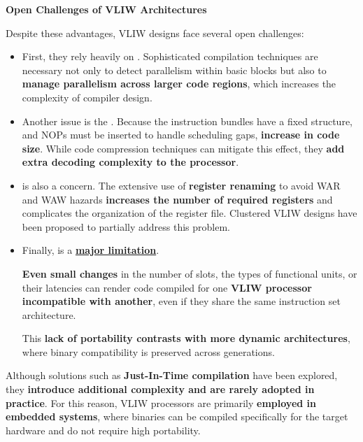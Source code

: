 \highspace
\begin{flushleft}
    \textcolor{Red2}{ \textbf{Open Challenges of VLIW Architectures}}
\end{flushleft}
Despite these advantages, VLIW designs face several open challenges:
\begin{itemize}
    \item First, they rely heavily on . Sophisticated compilation techniques are necessary not only to detect parallelism within basic blocks but also to \textbf{manage parallelism across larger code regions}, which increases the complexity of compiler design.

    \item Another issue is the . Because the instruction bundles have a fixed structure, and NOPs must be inserted to handle scheduling gaps, \textbf{increase in code size}. While code compression techniques can mitigate this effect, they \textbf{add extra decoding complexity to the processor}.

    \item {} is also a concern. The extensive use of \textbf{register renaming} to avoid WAR and WAW hazards \textbf{increases the number of required registers} and complicates the organization of the register file. Clustered VLIW designs have been proposed to partially address this problem.

    \item Finally,  is a \underline{\textbf{major limitation}}.

    \textbf{Even small changes} in the number of slots, the types of functional units, or their latencies can render code compiled for one \textbf{VLIW processor incompatible with another}, even if they share the same instruction set architecture.
    
    This \textbf{lack of portability contrasts with more dynamic architectures}, where binary compatibility is preserved across generations.
\end{itemize}
Although solutions such as \textbf{Just-In-Time compilation} have been explored, they \textbf{introduce additional complexity and are rarely adopted in practice}. For this reason, VLIW processors are primarily \textbf{employed in embedded systems}, where binaries can be compiled specifically for the target hardware and do not require high portability.
